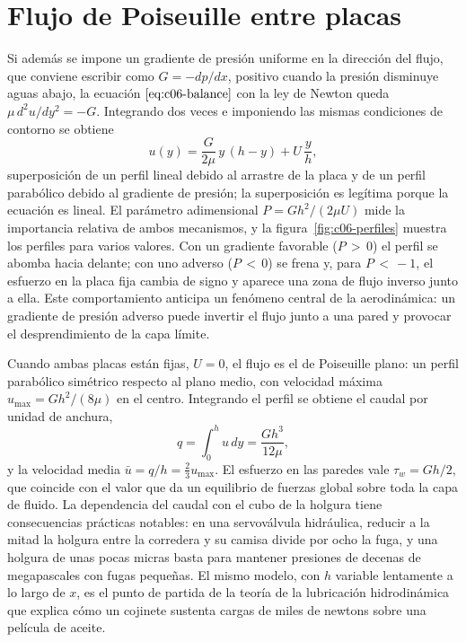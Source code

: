 \documentclass[10pt,openany]{book}
\begin{document}
\section{Flujo de Poiseuille entre placas}

Si además se impone un gradiente de presión uniforme en la dirección del flujo, que conviene escribir como \(G = -dp/dx\), positivo cuando la presión disminuye aguas abajo, la ecuación \(\eqref{eq:c06-balance}\) con la ley de Newton queda \(\mu\,d^{2}u/dy^{2} = -G\). Integrando dos veces e imponiendo las mismas condiciones de contorno se obtiene
\begin{equation}
u(y) = \frac{G}{2\mu}\,y\,(h - y) + U\,\frac{y}{h}, \label{eq:c06-couette}
\end{equation}
superposición de un perfil lineal debido al arrastre de la placa y de un perfil parabólico debido al gradiente de presión; la superposición es legítima porque la ecuación es lineal. El parámetro adimensional \(P = G h^{2}/(2\mu U)\) mide la importancia relativa de ambos mecanismos, y la figura~\ref{fig:c06-perfiles} muestra los perfiles para varios valores. Con un gradiente favorable (\(P\,>\,0\)) el perfil se abomba hacia delante; con uno adverso (\(P\,<\,0\)) se frena y, para \(P\,<\,-1\), el esfuerzo en la placa fija cambia de signo y aparece una zona de flujo inverso junto a ella. Este comportamiento anticipa un fenómeno central de la aerodinámica: un gradiente de presión adverso puede invertir el flujo junto a una pared y provocar el desprendimiento de la capa límite.

Cuando ambas placas están fijas, \(U = 0\), el flujo es el de Poiseuille plano: un perfil parabólico simétrico respecto al plano medio, con velocidad máxima \(u_{\max} = G h^{2}/(8\mu)\) en el centro. Integrando el perfil se obtiene el caudal por unidad de anchura,
\begin{equation}
q = \int_0^{h} u\,dy = \frac{G h^{3}}{12\mu}, \label{eq:c06-caudal-plano}
\end{equation}
y la velocidad media \(\bar u = q/h = \tfrac{2}{3}u_{\max}\). El esfuerzo en las paredes vale \(\tau_w = G h/2\), que coincide con el valor que da un equilibrio de fuerzas global sobre toda la capa de fluido. La dependencia del caudal con el cubo de la holgura tiene consecuencias prácticas notables: en una servoválvula hidráulica, reducir a la mitad la holgura entre la corredera y su camisa divide por ocho la fuga, y una holgura de unas pocas micras basta para mantener presiones de decenas de megapascales con fugas pequeñas. El mismo modelo, con \(h\) variable lentamente a lo largo de \(x\), es el punto de partida de la teoría de la lubricación hidrodinámica que explica cómo un cojinete sustenta cargas de miles de newtons sobre una película de aceite.
\end{document}
